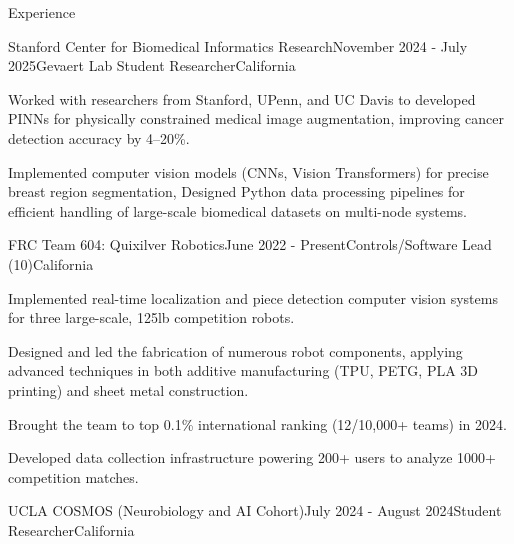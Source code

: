 \documentclass[
  10pt, %
]{resume}
\begin{document}
\sloppy


\begin{rSection}{Experience}


  \begin{rSubsection}{Stanford Center for Biomedical Informatics Research}{November 2024 - July 2025}{Gevaert Lab Student Researcher}{California}
    
    \item Worked with researchers from Stanford, UPenn, and UC Davis to developed PINNs for physically constrained medical image augmentation, improving cancer detection accuracy by 4–20\%.
    
    \item Implemented computer vision models (CNNs, Vision Transformers) for precise breast region segmentation, Designed Python data processing pipelines for efficient handling of large-scale biomedical datasets on multi-node systems.
    
  \end{rSubsection}
        
  \begin{rSubsection}{FRC Team 604: Quixilver Robotics}{June 2022 - Present}{Controls/Software Lead (10)}{California}
    
    \item Implemented real-time localization and piece detection computer vision systems for three large-scale, 125lb competition robots.
    
    \item Designed and led the fabrication of numerous robot components, applying advanced techniques in both additive manufacturing (TPU, PETG, PLA 3D printing) and sheet metal construction.
    
    \item Brought the team to top 0.1\% international ranking (12/10,000+ teams) in 2024.
    
    \item Developed data collection infrastructure powering 200+ users to analyze 1000+ competition matches.
    
  \end{rSubsection}
        
  \begin{rSubsection}{UCLA COSMOS (Neurobiology and AI Cohort)}{July 2024 - August 2024}{Student Researcher}{California}
    

\end{rSubsection}
\end{rSection}
\end{document}

